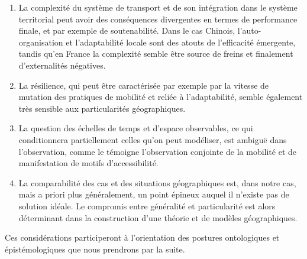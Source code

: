 \begin{enumerate}
	\item La complexité du système de transport et de son intégration dans le système territorial peut avoir des conséquences divergentes en termes de performance finale, et par exemple de soutenabilité. Dans le cas Chinois, l'auto-organisation et l'adaptabilité locale sont des atouts de l'efficacité émergente, tandis qu'en France la complexité semble être source de freins et finalement d'externalités négatives.
	\item La résilience, qui peut être caractérisée par exemple par la vitesse de mutation des pratiques de mobilité et reliée à l'adaptabilité, semble également très sensible aux particularités géographiques.
	\item La question des échelles de temps et d'espace observables, ce qui conditionnera partiellement celles qu'on peut modéliser, est ambiguë dans l'observation, comme le témoigne l'observation conjointe de la mobilité et de manifestation de motifs d'accessibilité.
	\item La comparabilité des cas et des situations géographiques est, dans notre cas, mais a priori plus généralement, un point épineux auquel il n'existe pas de solution idéale. Le compromis entre généralité et particularité est alors déterminant dans la construction d'une théorie et de modèles géographiques.
\end{enumerate}


Ces considérations participeront à l'orientation des postures ontologiques et épistémologiques que nous prendrons par la suite.





\stars




